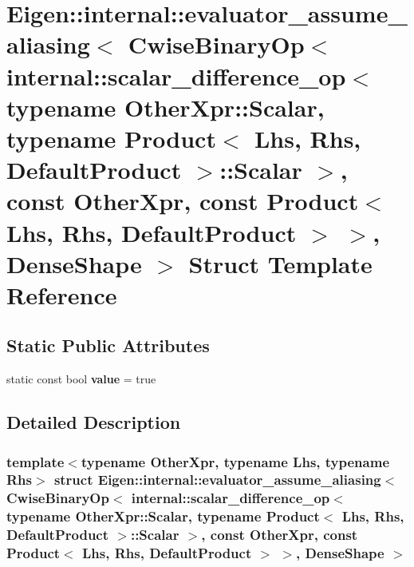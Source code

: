 \hypertarget{struct_eigen_1_1internal_1_1evaluator__assume__aliasing_3_01_cwise_binary_op_3_01internal_1_1sca69efad99c33943cb3731d094798b855b}{}\section{Eigen\+:\+:internal\+:\+:evaluator\+\_\+assume\+\_\+aliasing$<$ Cwise\+Binary\+Op$<$ internal\+:\+:scalar\+\_\+difference\+\_\+op$<$ typename Other\+Xpr\+:\+:Scalar, typename Product$<$ Lhs, Rhs, Default\+Product $>$\+:\+:Scalar $>$, const Other\+Xpr, const Product$<$ Lhs, Rhs, Default\+Product $>$ $>$, Dense\+Shape $>$ Struct Template Reference}
\label{struct_eigen_1_1internal_1_1evaluator__assume__aliasing_3_01_cwise_binary_op_3_01internal_1_1sca69efad99c33943cb3731d094798b855b}
\subsection*{Static Public Attributes}
\begin{DoxyCompactItemize}
\item 
\mbox{\label{struct_eigen_1_1internal_1_1evaluator__assume__aliasing_3_01_cwise_binary_op_3_01internal_1_1sca69efad99c33943cb3731d094798b855b_aa3be777fa1739bcad6aefb7cf307930e}} 
static const bool {\bfseries value} = true
\end{DoxyCompactItemize}


\subsection{Detailed Description}
\subsubsection*{template$<$typename Other\+Xpr, typename Lhs, typename Rhs$>$\newline
struct Eigen\+::internal\+::evaluator\+\_\+assume\+\_\+aliasing$<$ Cwise\+Binary\+Op$<$ internal\+::scalar\+\_\+difference\+\_\+op$<$ typename Other\+Xpr\+::\+Scalar, typename Product$<$ Lhs, Rhs, Default\+Product $>$\+::\+Scalar $>$, const Other\+Xpr, const Product$<$ Lhs, Rhs, Default\+Product $>$ $>$, Dense\+Shape $>$}



